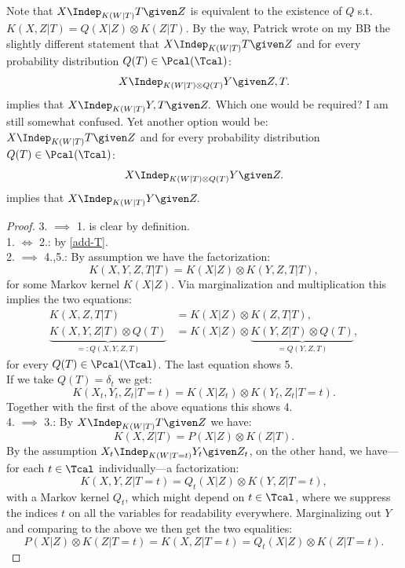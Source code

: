 \begin{Thm}
\begin{enumerate}[resume]
{    Note that $\displaystyle  X \Indep_{K(W|T)} T \given Z$ is equivalent to the existence of $Q$ s.t.\ $K(X,Z|T) = Q(X|Z)\otimes K(Z|T)$. By the way, Patrick wrote on my BB the slightly different statement that
   $\displaystyle  X \Indep_{K(W|T)} T \given Z$
and for every probability distribution $Q(T) \in \Pcal(\Tcal)$:
        \[ X \Indep_{K(W|T)\otimes Q(T) } Y \given Z,T.\]
        implies that $\displaystyle X \Indep_{K(W|T)} Y,T \given Z.$
        Which one would be required? I am still somewhat confused. Yet another option would be:
   $\displaystyle  X \Indep_{K(W|T)} T \given Z$
and for every probability distribution $Q(T) \in \Pcal(\Tcal)$:
        \[ X \Indep_{K(W|T)\otimes Q(T) } Y \given Z.\]
        implies that $\displaystyle X \Indep_{K(W|T)} Y \given Z.$
    }
\end{enumerate}
\begin{proof}
    3. $\implies$ 1. is clear by definition.\\
    1. $\iff$ 2.: by \ref{add-T}.\\
    2. $\implies$ 4.,5.:
    By assumption we have the factorization:
    \[K(X,Y,Z,T|T) = K(X|Z) \otimes K(Y,Z,T|T),\]
    for some Markov kernel $K(X|Z)$. Via marginalization and multiplication this implies the two equations:
    \begin{align*}
        K(X,Z,T|T)            &= K(X|Z) \otimes K(Z,T|T),\\
        \underbrace{K(X,Y,Z|T)\otimes Q(T)}_{=:Q(X,Y,Z,T)} &= K(X|Z) \otimes \underbrace{K(Y,Z|T) \otimes Q(T)}_{=Q(Y,Z,T)},
    \end{align*}
    for every $Q(T) \in \Pcal(\Tcal)$. The last equation shows 5.\\ 
    If we take $Q(T)=\delta_t$ we get:
    \[K(X_t,Y_t,Z_t|T=t) = K(X|Z_t) \otimes K(Y_t,Z_t|T=t). \]
    Together with the first of the above equations this shows 4.\\
    4. $\implies$ 3.: By $X \Indep_{K(W|T)} T \given Z$ we have:
    \[K(X,Z|T) = P(X|Z) \otimes K(Z|T).\]
    By the assumption $ X_t \Indep_{K(W|T=t)} Y_t \given Z_t$, on the other hand, we have---for each $t \in \Tcal$ individually---a factorization:
    \[ K(X,Y,Z|T=t) = Q_t(X|Z) \otimes K(Y,Z|T=t),  \]
    with a Markov kernel $Q_t$, which might depend on $t \in \Tcal$, where we suppress the indices $t$ on all the variables for readability everywhere.
Marginalizing out $Y$ and comparing to the above we then get the two equalities:
\[ P(X|Z) \otimes K(Z|T=t) = K(X,Z|T=t)  = Q_t(X|Z) \otimes K(Z|T=t).\]

\end{proof}
\end{Thm}
